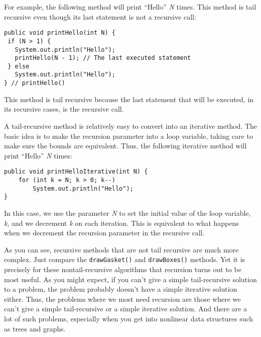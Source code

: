 For example, the following method will print ``Hello'' {\it N} times.   This
method is tail recursive even though its last statement is not a
recursive call:

\begin{jjjlisting}
\begin{lstlisting}
public void printHello(int N) {
 if (N > 1) {
   System.out.println("Hello");
   printHello(N - 1); // The last executed statement
 } else
   System.out.println("Hello");
} // printHello()
\end{lstlisting}
\end{jjjlisting}

\noindent This method is tail recursive because the last statement
that will be executed, in its recursive cases, is the recursive call.

A tail-recursive method is relatively easy to convert into an
iterative method.  The basic idea is to make the recursion parameter
into a loop variable, taking care to make sure the bounds are equivalent.
Thus, the following iterative method will print ``Hello'' {\it N} times:

\begin{jjjlisting}
\begin{lstlisting}
public void printHelloIterative(int N) {
    for (int k = N; k > 0; k--)
        System.out.println("Hello");
}
\end{lstlisting}
\end{jjjlisting}

\noindent In this case, we use the parameter {\it N} to set the
initial value of the loop variable, {\it k}, and we decrement {\it k}
on each iteration.  This is equivalent to what happens when we
decrement the recursion parameter in the recursive call.


As you can see, recursive methods that are not tail recursive are much
more complex.  Just compare the {\tt drawGasket()} and
{\tt drawBoxes()} methods.  Yet it is precisely for these nontail-recursive
algorithms that recursion turns out to be most useful.  As you might
expect, if you can't give a simple tail-recursive solution to a
problem, the problem probably doesn't have a simple iterative solution
either.   Thus, the problems where we most need recursion are those where
we can't give a simple tail-recursive or a simple iterative solution.
And there are a lot of such problems, especially when you get into
nonlinear data structures such as trees and graphs.

